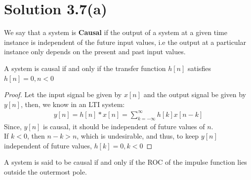 \documentclass[journal,12pt,twocolumn]{IEEEtran}
\begin{document}
\section*{Solution 3.7(a)}
\begin{definition}
We say that a system is \textbf{Causal} if the output of a system at a given time instance is independent of the future input values, i.e the output at a particular instance only depends on the present and past input values.
\end{definition}
\begin{lemma}
A system is causal if and only if the transfer function $h[n]$ satisfies $h[n] = 0 , n<0$
\end{lemma}
\begin{proof}
Let the input signal be given by $x[n]$ and the output signal be given by $y[n]$, then, we know in an LTI system:
\begin{align}
    y[n] = h[n] * x[n] = \sum_{k = -\infty}^\infty h[k]x[n-k]
\end{align}
Since, $y[n]$ is causal, it should be independent of future values of $n$. \\
If $k < 0$, then $n - k > n$, which is undesirable, and thus, to keep $y[n]$ independent of future values, $h[k] = 0 , k< 0$
\end{proof}
\begin{lemma}
A system is said to be causal if and only if the ROC of the impulse function lies outside the outermost pole.
\label{Causal}
\end{lemma}
\end{document}
